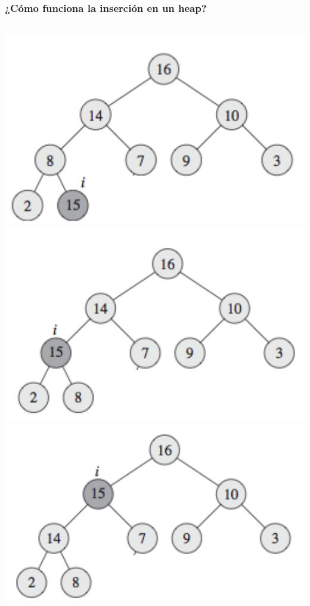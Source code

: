 \documentclass{beamer}
\begin{document}
	\begin{frame}
		\frametitle{¿Cómo funciona la inserción en un heap?}
		\begin{columns}
			\includegraphics[width = 1.15\textwidth]{heap_insert1.png}
			\includegraphics[width = 1.15\textwidth]{heap_insert2.png}
			\includegraphics[width = 1.15\textwidth]{heap_insert3.png}
		\end{columns}
	\end{frame}
	
\end{document}
